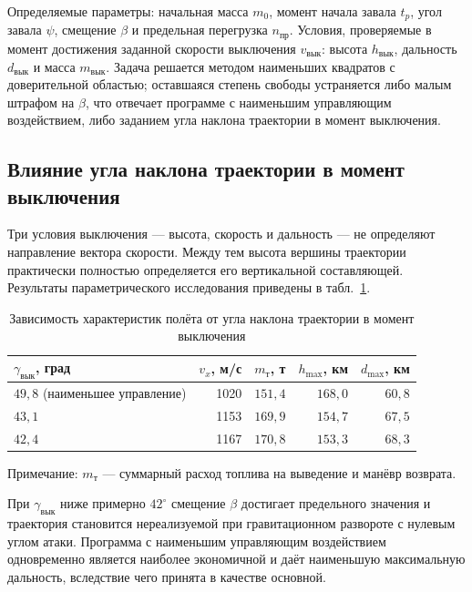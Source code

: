 \documentclass[11pt,a4paper]{article}
\begin{document}
Определяемые параметры: начальная масса $m_0$, момент начала завала $t_p$, угол
завала $\psi$, смещение $\beta$ и предельная перегрузка $n_{\text{пр}}$. Условия,
проверяемые в момент достижения заданной скорости выключения $v_{\text{вык}}$:
высота $h_{\text{вык}}$, дальность $d_{\text{вык}}$ и масса $m_{\text{вык}}$.
Задача решается методом наименьших квадратов с доверительной областью;
оставшаяся степень свободы устраняется либо малым штрафом на $\beta$, что
отвечает программе с наименьшим управляющим воздействием, либо заданием угла
наклона траектории в момент выключения.

\subsection{Влияние угла наклона траектории в момент выключения}

Три условия выключения — высота, скорость и дальность — не определяют
направление вектора скорости. Между тем высота вершины траектории практически
полностью определяется его вертикальной составляющей. Результаты
параметрического исследования приведены в табл.~\ref{tab:gamma}.

\begin{table}[htb]
\centering
\caption{Зависимость характеристик полёта от угла наклона траектории
в момент выключения}
\label{tab:gamma}
\begin{tabular}{lrrrr}
\toprule
$\gamma_{\text{вык}}$, град & $v_x$, м/с & $m_{\text{т}}$, т
 & $h_{\max}$, км & $d_{\max}$, км \\
\midrule
$49{,}8$ (наименьшее управление) & 1020 & $151{,}4$ & $168{,}0$ & $60{,}8$ \\
$43{,}1$ & 1153 & $169{,}9$ & $154{,}7$ & $67{,}5$ \\
$42{,}4$ & 1167 & $170{,}8$ & $153{,}3$ & $68{,}3$ \\
\bottomrule
\end{tabular}

\smallskip
\footnotesize Примечание: $m_{\text{т}}$ — суммарный расход топлива на
выведение и манёвр возврата.
\end{table}

При $\gamma_{\text{вык}}$ ниже примерно $42^\circ$ смещение $\beta$ достигает
предельного значения и траектория становится нереализуемой при гравитационном
развороте с нулевым углом атаки. Программа с наименьшим управляющим
воздействием одновременно является наиболее экономичной и даёт наименьшую
максимальную дальность, вследствие чего принята в качестве основной.
\end{document}
